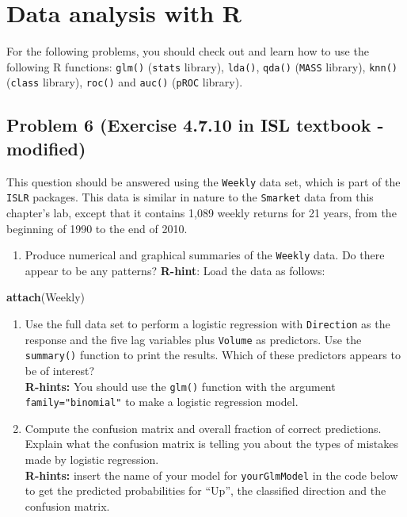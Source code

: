 \documentclass[]{article}
\newenvironment{Shaded}{\begin{snugshade}}{\end{snugshade}}
\newcommand{\KeywordTok}[1]{\textcolor[rgb]{0.13,0.29,0.53}{\textbf{#1}}}
\newcommand{\NormalTok}[1]{#1}
\providecommand{\tightlist}{%
  \setlength{\itemsep}{0pt}\setlength{\parskip}{0pt}}
\begin{document}
\section{Data analysis with R}\label{data-analysis-with-r}

For the following problems, you should check out and learn how to use
the following R functions: \texttt{glm()} (\texttt{stats} library),
\texttt{lda()}, \texttt{qda()} (\texttt{MASS} library), \texttt{knn()}
(\texttt{class} library), \texttt{roc()} and \texttt{auc()}
(\texttt{pROC} library).

\subsection{Problem 6 (Exercise 4.7.10 in ISL textbook -
modified)}\label{problem-6-exercise-4.7.10-in-isl-textbook---modified}

This question should be answered using the \texttt{Weekly} data set,
which is part of the \texttt{ISLR} packages. This data is similar in
nature to the \texttt{Smarket} data from this chapter's lab, except that
it contains 1,089 weekly returns for 21 years, from the beginning of
1990 to the end of 2010.

\begin{enumerate}
\def\labelenumi{\alph{enumi}.}
\tightlist
\item
  Produce numerical and graphical summaries of the \texttt{Weekly} data.
  Do there appear to be any patterns? \textbf{R-hint}: Load the data as
  follows:
\end{enumerate}

\begin{Shaded}
\begin{Highlighting}[]
\KeywordTok{attach}\NormalTok{(Weekly)}
\end{Highlighting}
\end{Shaded}

\begin{enumerate}
\def\labelenumi{\alph{enumi}.}
\setcounter{enumi}{1}
\item
  Use the full data set to perform a logistic regression with
  \texttt{Direction} as the response and the five lag variables plus
  \texttt{Volume} as predictors. Use the \texttt{summary()} function to
  print the results. Which of these predictors appears to be of
  interest?\\
  \textbf{R-hints:} You should use the \texttt{glm()} function with the
  argument \texttt{family="binomial"} to make a logistic regression
  model.
\item
  Compute the confusion matrix and overall fraction of correct
  predictions. Explain what the confusion matrix is telling you about
  the types of mistakes made by logistic regression.\\
  \textbf{R-hints:} insert the name of your model for
  \texttt{yourGlmModel} in the code below to get the predicted
  probabilities for ``Up'', the classified direction and the confusion
  matrix.
\end{enumerate}
\end{document}
